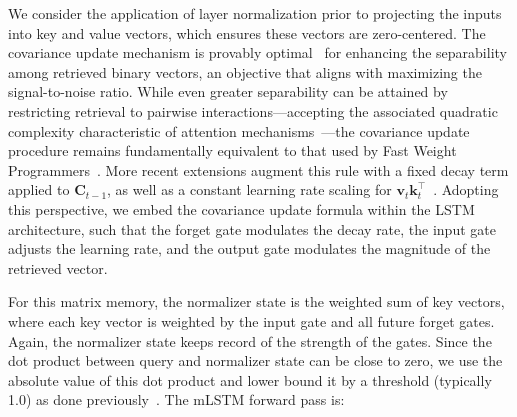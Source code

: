 We consider the application of layer normalization prior to projecting the inputs into key and value vectors, which ensures these vectors are zero-centered. The covariance update mechanism is provably optimal~\citep{Dayan:91} for enhancing the separability among retrieved binary vectors, an objective that aligns with maximizing the signal-to-noise ratio. While even greater separability can be attained by restricting retrieval to pairwise interactions—accepting the associated quadratic complexity characteristic of attention mechanisms~\citep{Krotov:16,Krotov:17,Ramsauer:21}—the covariance update procedure remains fundamentally equivalent to that used by Fast Weight Programmers~\citep{Schmidhuber:92ncfastweights,Schlag:21}. More recent extensions augment this rule with a fixed decay term applied to $\mathbf{C}_{t-1}$, as well as a constant learning rate scaling for 
$\mathbf{v}_{t} \mathbf{k}_t ^\top$~\citep{Ba:16}.
Adopting this perspective, we embed the covariance update formula within the LSTM architecture, such that the forget gate modulates the decay rate, the input gate adjusts the learning rate, and the output gate modulates the magnitude of the retrieved vector.

For this matrix memory, the normalizer state is the weighted sum of key vectors, where each key vector is weighted by the input gate and all future forget gates. Again, the normalizer state keeps record of the strength of the gates. Since the dot product between query and normalizer state can be close to zero, we use the absolute value of this dot product and lower bound it by a threshold (typically 1.0) as done previously~\citep{Sun:23arxiv}. The mLSTM forward pass is:

